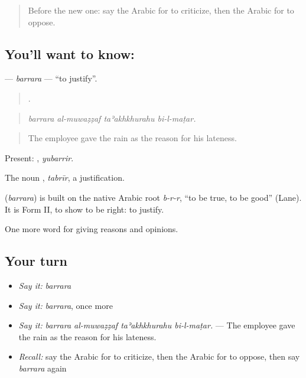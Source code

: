 \label{lesson:AR-C370-barrara}



\begin{quote}
Before the new one: say the Arabic for to criticize, then the Arabic for to oppose.
\end{quote}

\subsection*{You'll want to know: }
\textbf{} — \emph{barrara} — \textquotedblleft{}to justify\textquotedblright{}.

\begin{quote}
   .
\end{quote}

\begin{quote}
\emph{barrara al-muwaẓẓaf taʾakhkhurahu bi-l-maṭar.}
\end{quote}

\begin{quote}
The employee gave the rain as the reason for his lateness.
\end{quote}

Present: , \emph{yubarrir}.

The noun , \emph{tabrīr}, a justification.

\begin{cousinweb}
\textbf{} (\emph{barrara}) is built on the native Arabic root \emph{b-r-r}, \textquotedblleft{}to be true, to be good\textquotedblright{} (Lane). It is Form II, to show to be right: to justify.
\end{cousinweb}

\begin{grammarlens}[title={What you've built}]
One more word for giving reasons and opinions.
\end{grammarlens}

\subsection*{Your turn}
\begin{itemize}
\raggedright
  \item \emph{Say it:} \emph{barrara}
  \item \emph{Say it:} \emph{barrara}, once more
  \item \emph{Say it:} \emph{barrara al-muwaẓẓaf taʾakhkhurahu bi-l-maṭar.} — The employee gave the rain as the reason for his lateness.
  \item \emph{Recall:} say the Arabic for to criticize, then the Arabic for to oppose, then say \emph{barrara} again
\end{itemize}

